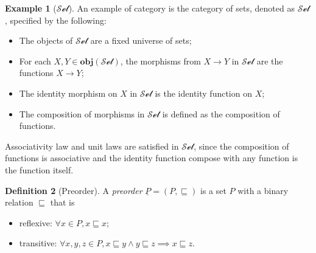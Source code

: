 \documentclass[12pt,a4paper]{report}
\theoremstyle{definition}
\newtheorem{definition}{Definition}[chapter]
\newtheorem{example}[definition]{Example}
\begin{document}
        \begin{example}[$\mathcal{Set}$]
            An example of category is the category of sets, denoted as $\mathcal{Set}$, specified by the following:
            \begin{itemize}
                \item 
                    The objects of $\mathcal{Set}$ are a fixed universe of sets;
                \item
                    For each $X, Y \in \textbf{obj}(\mathcal{Set})$, the morphisms from $X \to Y$ in $\mathcal{Set}$ are the functions $X \to Y$;
                \item
                    The identity morphism on $X$ in $\mathcal{Set}$ is the identity function on $X$;
                \item
                    The composition of morphisms in $\mathcal{Set}$ is defined as the composition of functions.
            \end{itemize}
            Associativity law and unit laws are satisfied in $\mathcal{Set}$, since the composition of functions is associative and the identity function compose with any function is the function itself.
        \end{example}

        \begin{definition}[Preorder]
            A \emph{preorder} $\underline{P} = (P, \sqsubseteq)$ is a set $P$ with a binary relation $\sqsubseteq$ that is
            \begin{itemize}
                \item reflexive: $\forall x \in P, x \sqsubseteq x$;
                \item transitive: $\forall x, y, z \in P, x \sqsubseteq y \land y \sqsubseteq z \implies x \sqsubseteq z$.
            \end{itemize}
        \end{definition}
\end{document}
